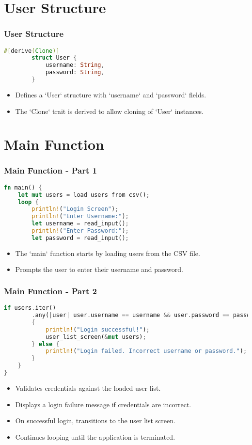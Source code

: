 \documentclass[aspectratio=169, table]{beamer}
\begin{document}
\section{User Structure}
\begin{frame}[fragile]
	\frametitle{User Structure}
	\begin{lstlisting}[language=Rust]
		#[derive(Clone)]
		struct User {
			username: String,
			password: String,
		}
	\end{lstlisting}
	\begin{itemize}
		\item Defines a `User` structure with `username` and `password` fields.
		\item The `Clone` trait is derived to allow cloning of `User` instances.
	\end{itemize}
\end{frame}

\section{Main Function}

\begin{frame}[fragile]
\frametitle{Main Function - Part 1}
\begin{lstlisting}[language=Rust]
fn main() {
	let mut users = load_users_from_csv();
	loop {
		println!("Login Screen");
		println!("Enter Username:");
		let username = read_input();
		println!("Enter Password:");
		let password = read_input();
		\end{lstlisting}
		\begin{itemize}
			\item The `main` function starts by loading users from the CSV file.
			\item Prompts the user to enter their username and password.
		\end{itemize}
	\end{frame}
	
	\begin{frame}[fragile]
		\vspace{15pt}
		\frametitle{Main Function - Part 2}
		\begin{lstlisting}[language=Rust]
		if users.iter()
		.any(|user| user.username == username && user.password == password)
		{
			println!("Login successful!");
			user_list_screen(&mut users);
		} else {
			println!("Login failed. Incorrect username or password.");
		}
	}
}
\end{lstlisting}
\begin{itemize}
\item Validates credentials against the loaded user list.
\item Displays a login failure message if credentials are incorrect.
\item On successful login, transitions to the user list screen.
\item Continues looping until the application is terminated.
\end{itemize}
\end{frame}
\end{document}
